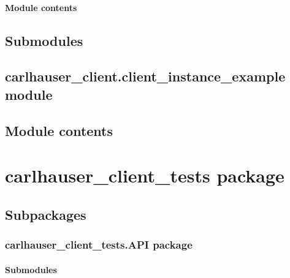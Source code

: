 \documentclass[letterpaper,10pt,english]{sphinxmanual}
\begin{document}
\subsubsection{Module contents}
\label{\detokenize{carlhauser_client.Helpers:module-carlhauser_client.Helpers}}\label{\detokenize{carlhauser_client.Helpers:module-contents}}

\section{Submodules}
\label{\detokenize{carlhauser_client:submodules}}

\section{carlhauser\_client.client\_instance\_example module}
\label{\detokenize{carlhauser_client:carlhauser-client-client-instance-example-module}}

\section{Module contents}
\label{\detokenize{carlhauser_client:module-carlhauser_client}}\label{\detokenize{carlhauser_client:module-contents}}

\chapter{carlhauser\_client\_tests package}
\label{\detokenize{carlhauser_client_tests:carlhauser-client-tests-package}}\label{\detokenize{carlhauser_client_tests::doc}}

\section{Subpackages}
\label{\detokenize{carlhauser_client_tests:subpackages}}

\subsection{carlhauser\_client\_tests.API package}
\label{\detokenize{carlhauser_client_tests.API:carlhauser-client-tests-api-package}}\label{\detokenize{carlhauser_client_tests.API::doc}}

\subsubsection{Submodules}
\label{\detokenize{carlhauser_client_tests.API:submodules}}
\end{document}
